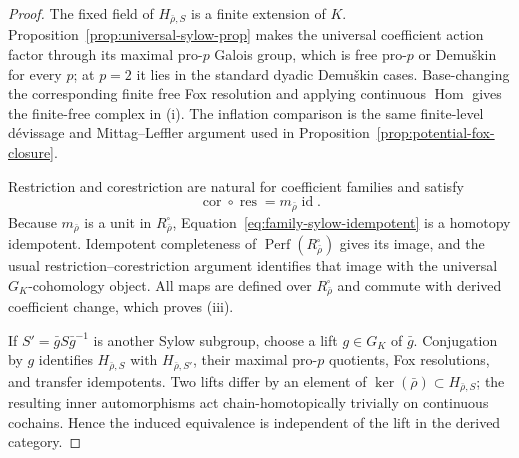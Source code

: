 \documentclass[11pt]{article}
\theoremstyle{definition}
\newcommand{\Perf}{\operatorname{Perf}}
\begin{document}
\begin{proof}
The fixed field of $H_{\bar\rho,S}$ is a finite extension of $K$.  Proposition~\ref{prop:universal-sylow-prop} makes the universal coefficient action factor through its maximal pro-$p$ Galois group, which is free pro-$p$ or Demu\v{s}kin for every $p$; at $p=2$ it lies in the standard dyadic Demu\v{s}kin cases.  Base-changing the corresponding finite free Fox resolution and applying continuous $\operatorname{Hom}$ gives the finite-free complex in (i).  The inflation comparison is the same finite-level d\'evissage and Mittag--Leffler argument used in Proposition~\ref{prop:potential-fox-closure}.

Restriction and corestriction are natural for coefficient families and satisfy
\[
\operatorname{cor}\circ\operatorname{res}
=m_{\bar\rho}\operatorname{id}.
\]
Because $m_{\bar\rho}$ is a unit in $R_{\bar\rho}^{\square}$, Equation~\eqref{eq:family-sylow-idempotent} is a homotopy idempotent.  Idempotent completeness of $\Perf(R_{\bar\rho}^{\square})$ gives its image, and the usual restriction--corestriction argument identifies that image with the universal $G_K$-cohomology object.  All maps are defined over $R_{\bar\rho}^{\square}$ and commute with derived coefficient change, which proves (iii).

If $S'=\bar gS\bar g^{-1}$ is another Sylow subgroup, choose a lift $g\in G_K$ of $\bar g$.  Conjugation by $g$ identifies $H_{\bar\rho,S}$ with $H_{\bar\rho,S'}$, their maximal pro-$p$ quotients, Fox resolutions, and transfer idempotents.  Two lifts differ by an element of $\ker(\bar\rho)\subset H_{\bar\rho,S}$; the resulting inner automorphisms act chain-homotopically trivially on continuous cochains.  Hence the induced equivalence is independent of the lift in the derived category.
\end{proof}
\end{document}
